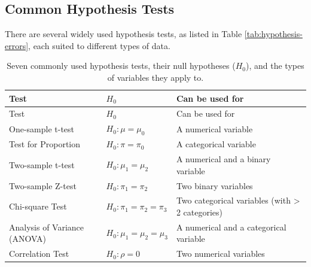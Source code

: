 \documentclass[
]{book}
\theoremstyle{definition}
\theoremstyle{definition}
\theoremstyle{definition}
\theoremstyle{definition}
\theoremstyle{remark}
\begin{document}
\subsection*{Common Hypothesis Tests}\label{common-hypothesis-tests}

There are several widely used hypothesis tests, as listed in Table \ref{tab:hypothesis-errors}, each suited to different types of data.

\begin{longtable}[]{@{}
  >{\raggedright\arraybackslash}p{}
  >{\raggedright\arraybackslash}p{}
  >{\raggedright\arraybackslash}p{}@{}}
\caption{\label{tab:hypothesis-test} Seven commonly used hypothesis tests, their null hypotheses (\(H_0\)), and the types of variables they apply to.}\tabularnewline
\toprule\noalign{}
\begin{minipage}[b]{\linewidth}\raggedright
Test
\end{minipage} & \begin{minipage}[b]{\linewidth}\raggedright
\(H_0\)
\end{minipage} & \begin{minipage}[b]{\linewidth}\raggedright
Can be used for
\end{minipage} \\
\midrule\noalign{}
\endfirsthead
\toprule\noalign{}
\begin{minipage}[b]{\linewidth}\raggedright
Test
\end{minipage} & \begin{minipage}[b]{\linewidth}\raggedright
\(H_0\)
\end{minipage} & \begin{minipage}[b]{\linewidth}\raggedright
Can be used for
\end{minipage} \\
\midrule\noalign{}
\endhead
\bottomrule\noalign{}
\endlastfoot
One-sample t-test & \(H_0: \mu = \mu_0\) & A numerical variable \\
Test for Proportion & \(H_0: \pi = \pi_0\) & A categorical variable \\
Two-sample t-test & \(H_0: \mu_1 = \mu_2\) & A numerical and a binary variable \\
Two-sample Z-test & \(H_0: \pi_1 = \pi_2\) & Two binary variables \\
Chi-square Test & \(H_0: \pi_1 = \pi_2 = \pi_3\) & Two categorical variables (with \textgreater{} 2 categories) \\
Analysis of Variance (ANOVA) & \(H_0: \mu_1 = \mu_2 = \mu_3\) & A numerical and a categorical variable \\
Correlation Test & \(H_0: \rho = 0\) & Two numerical variables \\
\end{longtable}
\end{document}
